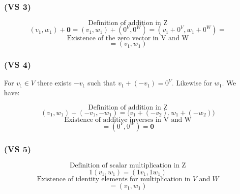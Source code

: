\documentclass{article}
\begin{document}
\subsubsection*{(VS 3)}


\begin{equation*}
    \text{Definition of addition in Z}
\end{equation*}
\begin{equation*}
    (v_{1}, w_{1}) + \boldsymbol{0} = (v_{1}, w_{1}) + (0^{V}, 0^{W}) = (v_{1} + 0^{V}, w_{1} + 0^{W}) =
\end{equation*}
\begin{equation*}
    \text{Existence of the zero vector in V and W}
\end{equation*}
\begin{equation*}
    = (v_{1}, w_{1})
\end{equation*}

\subsubsection*{(VS 4)}

For \(v_{1} \in V\) there exists \(-v_{1}\) such that \(v_{1} + (-v_{1}) = 0^{V}\). Likewise for \(w_{1}\). We have:

\begin{equation*}
    \text{Definition of addition in Z}
\end{equation*}
\begin{equation*}
    (v_{1}, w_{1}) + (-v_{1}, -w_{1}) = \Big(v_{1} + (-v_{2}), w_{1} + (-w_{2})\Big)
\end{equation*}
\begin{equation*}
    \text{Existence of additive inverses in V and W}
\end{equation*}
\begin{equation*}
    = (0^{V}, 0^{W}) = \boldsymbol{0}
\end{equation*}

\subsubsection*{(VS 5)}

\begin{equation*}
    \text{Definition of scalar multiplication in Z}
\end{equation*}
\begin{equation*}
    1(v_{1}, w_{1}) = (1v_{1}, 1w_{1})
\end{equation*}
\begin{equation*}
    \text{Existence of identity elements for multiplication in \(V\) and \(W\)}
\end{equation*}
\begin{equation*}
    = (v_{1}, w_{1})
\end{equation*}
\end{document}
